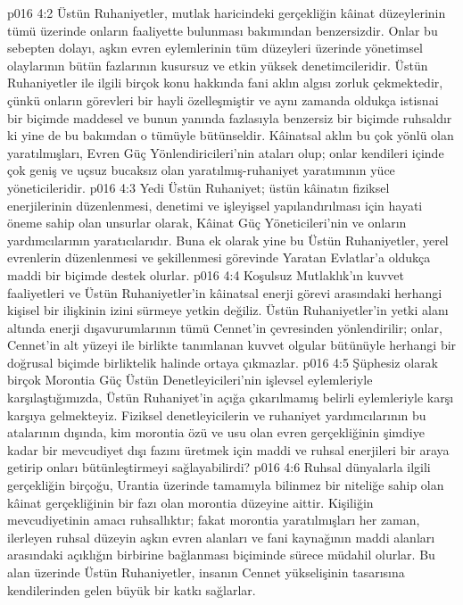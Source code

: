 \vs p016 4:2 Üstün Ruhaniyetler, mutlak haricindeki gerçekliğin kâinat düzeylerinin tümü üzerinde onların faaliyette bulunması bakımından benzersizdir. Onlar bu sebepten dolayı, aşkın evren eylemlerinin tüm düzeyleri üzerinde yönetimsel olaylarının bütün fazlarının kusursuz ve etkin yüksek denetimcileridir. Üstün Ruhaniyetler ile ilgili birçok konu hakkında fani aklın algısı zorluk çekmektedir, çünkü onların görevleri bir hayli özelleşmiştir ve aynı zamanda oldukça istisnai bir biçimde maddesel ve bunun yanında fazlasıyla benzersiz bir biçimde ruhsaldır ki yine de bu bakımdan o tümüyle bütünseldir. Kâinatsal aklın bu çok yönlü olan yaratılmışları, Evren Güç Yönlendiricileri’nin ataları olup; onlar kendileri içinde çok geniş ve uçsuz bucaksız olan yaratılmış\hyp{}ruhaniyet yaratımının yüce yöneticileridir.
\vs p016 4:3 Yedi Üstün Ruhaniyet; üstün kâinatın fiziksel enerjilerinin düzenlenmesi, denetimi ve işleyişsel yapılandırılması için hayati öneme sahip olan unsurlar olarak, Kâinat Güç Yöneticileri’nin ve onların yardımcılarının yaratıcılarıdır. Buna ek olarak yine bu Üstün Ruhaniyetler, yerel evrenlerin düzenlenmesi ve şekillenmesi görevinde Yaratan Evlatlar’a oldukça maddi bir biçimde destek olurlar.
\vs p016 4:4 Koşulsuz Mutlaklık’ın kuvvet faaliyetleri ve Üstün Ruhaniyetler’in kâinatsal enerji görevi arasındaki herhangi kişisel bir ilişkinin izini sürmeye yetkin değiliz. Üstün Ruhaniyetler’in yetki alanı altında enerji dışavurumlarının tümü Cennet’in çevresinden yönlendirilir; onlar, Cennet’in alt yüzeyi ile birlikte tanımlanan kuvvet olgular bütünüyle herhangi bir doğrusal biçimde birliktelik halinde ortaya çıkmazlar.
\vs p016 4:5 Şüphesiz olarak birçok Morontia Güç Üstün Denetleyicileri’nin işlevsel eylemleriyle karşılaştığımızda, Üstün Ruhaniyet’in açığa çıkarılmamış belirli eylemleriyle karşı karşıya gelmekteyiz. Fiziksel denetleyicilerin ve ruhaniyet yardımcılarının bu atalarının dışında, kim morontia özü ve usu olan evren gerçekliğinin şimdiye kadar bir mevcudiyet dışı fazını üretmek için maddi ve ruhsal enerjileri bir araya getirip onları bütünleştirmeyi sağlayabilirdi?
\vs p016 4:6 Ruhsal dünyalarla ilgili gerçekliğin birçoğu, Urantia üzerinde tamamıyla bilinmez bir niteliğe sahip olan kâinat gerçekliğinin bir fazı olan morontia düzeyine aittir. Kişiliğin mevcudiyetinin amacı ruhsallıktır; fakat morontia yaratılmışları her zaman, ilerleyen ruhsal düzeyin aşkın evren alanları ve fani kaynağının maddi alanları arasındaki açıklığın birbirine bağlanması biçiminde sürece müdahil olurlar. Bu alan üzerinde Üstün Ruhaniyetler, insanın Cennet yükselişinin tasarısına kendilerinden gelen büyük bir katkı sağlarlar.
